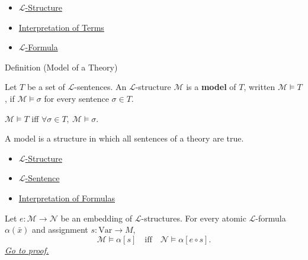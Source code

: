\begin{dependencies}
\begin{itemize}
  \item \hyperref[def:l-structure]{$\mathcal{L}$-Structure}
  \item \hyperref[def:term-interpretation]{Interpretation of Terms}
  \item \hyperref[def:l-formula]{$\mathcal{L}$-Formula}
\end{itemize}
\end{dependencies}

\begin{definitionbox}{Definition (Model of a Theory)}
\begin{definition}\label{def:model-of-theory}
Let $T$ be a set of $\mathcal{L}$-sentences. An $\mathcal{L}$-structure
$\mathcal{M}$ is a \textbf{model} of $T$, written $\mathcal{M}\models T$, if
$\mathcal{M}\models\sigma$ for every sentence $\sigma\in T$.
\end{definition}
\end{definitionbox}

\begin{remark*}
$\mathcal{M}\models T$ iff $\forall\sigma\in T,\ \mathcal{M}\models\sigma$.
\end{remark*}

\begin{remark*}[Interpretation]
A model is a structure in which all sentences of a theory are true.
\end{remark*}

\begin{dependencies}
\begin{itemize}
  \item \hyperref[def:l-structure]{$\mathcal{L}$-Structure}
  \item \hyperref[def:l-sentence]{$\mathcal{L}$-Sentence}
  \item \hyperref[def:formula-interpretation]{Interpretation of Formulas}
\end{itemize}
\end{dependencies}

\begin{lemma}\label{lem:embeddings-preserve-atomic-formulas}
Let $e\colon\mathcal{M}\to\mathcal{N}$ be an embedding of
$\mathcal{L}$-structures. For every atomic $\mathcal{L}$-formula
$\alpha(\bar x)$ and assignment $s\colon\mathrm{Var}\to M$,
\[
  \mathcal{M}\models \alpha[s]
  \quad\text{iff}\quad
  \mathcal{N}\models \alpha[e\circ s].
\]
\hyperref[prf:embeddings-preserve-atomic-formulas]{\textit{Go to proof.}}
\end{lemma}

